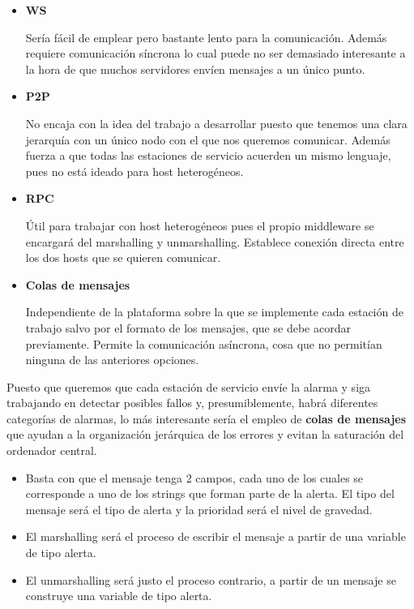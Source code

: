 \begin{problem}[13]
      \begin{itemize}
      \item \textbf{WS}

      Sería fácil de emplear pero bastante lento para la comunicación. Además requiere comunicación síncrona lo cual puede no ser demasiado interesante a la hora de que muchos servidores envíen mensajes a un único punto.

      \item \textbf{P2P}

      No encaja con la idea del trabajo a desarrollar puesto que tenemos una clara jerarquía con un único nodo con el que nos queremos comunicar. Además fuerza a que todas las estaciones de servicio acuerden un mismo lenguaje, pues no está ideado para host heterogéneos.

      \item \textbf{RPC}

      Útil para trabajar con host heterogéneos pues el propio middleware se encargará del marshalling y unmarshalling. Establece conexión directa entre los dos hosts que se quieren comunicar.

      \item \textbf{Colas de mensajes}

      Independiente de la plataforma sobre la que se implemente cada estación de trabajo salvo por el formato de los mensajes, que se debe acordar previamente. Permite la comunicación asíncrona, cosa que no permitían ninguna de las anteriores opciones.

      \end{itemize}
    Puesto que queremos que cada estación de servicio envíe la alarma y siga trabajando en detectar posibles fallos y, presumiblemente, habrá diferentes categorías de alarmas, lo más interesante sería el empleo de \textbf{colas de mensajes} que ayudan a la organización jerárquica de los errores y evitan la saturación del ordenador central.

      \spart

      \begin{itemize}
        \item Basta con que el mensaje tenga 2 campos, cada uno de los cuales se corresponde a uno de los strings que forman parte de la alerta. El tipo del mensaje será el tipo de alerta y la prioridad será el nivel de gravedad.

        \item El marshalling será el proceso de escribir el mensaje a partir de una variable de tipo alerta.

        \item El unmarshalling será justo el proceso contrario, a partir de un mensaje se construye una variable de tipo alerta.
      \end{itemize}

      \end{problem}

